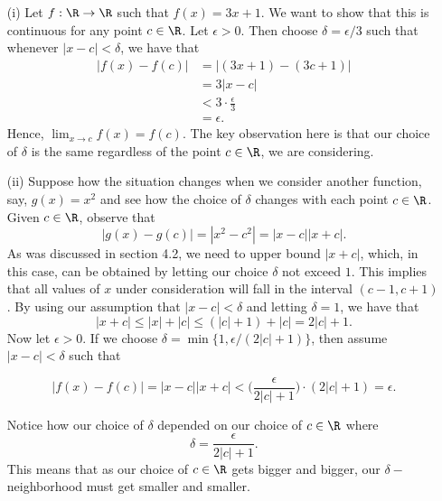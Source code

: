 \begin{example}{}{}
\begin{enumerate}
    \item[(i)] Let \( f: \R \to \R  \) such that \( f(x) = 3x + 1  \). We want to show that this is continuous for any point \( c \in \R  \). Let \( \epsilon  > 0  \). Then choose \( \delta = \epsilon  / 3  \) such that whenever \( | x - c  | < \delta  \), we have that 
\begin{align*}
    | f(x) - f(c) | &= |  (3x + 1 ) - (3c + 1 ) |  \\
                    &= 3 | x - c  | \\
                    &< 3 \cdot \frac{ \epsilon  }{ 3 } \\
                    &= \epsilon.
\end{align*}
Hence, \( \lim_{ x \to c } f(x) = f(c) \). The key observation here is that our choice of \( \delta  \) is the same regardless of the point \( c \in \R  \), we are considering.
    \item[(ii)] Suppose how the situation changes when we consider another function, say, \( g(x) = x^2  \) and see how the choice of \( \delta  \) changes with each point \( c \in \R  \). Given \( c \in \R  \), observe that 
        \[  | g(x) - g(c) | = | x^2 - c^2  | = | x -c | | x + c  |.  \]
As was discussed in section 4.2, we need to upper bound \( | x + c  |  \), which, in this case, can be obtained by letting our choice \( \delta \) not exceed \( 1 \). This implies that all values of \( x  \) under consideration will fall in the interval \( (c - 1, c + 1 ) \). By using our assumption that \( | x - c  | < \delta  \) and letting \( \delta = 1  \), we have that 
\[  | x + c  | \leq | x | + | c  | \leq (| c  | + 1 ) + | c  | = 2 | c | + 1  . \] Now let \( \epsilon  > 0  \). If we choose \( \delta = \min \{ 1, \epsilon / (2 | c  | + 1 ) \} \), then assume \( | x - c  | < \delta  \) such that 

\[ | f(x) - f(c)  | = | x - c  | | x + c  | < \Big( \frac{ \epsilon  }{ 2 | c  | + 1  }  \Big) \cdot ( 2 | c  | + 1) = \epsilon. \]

Notice how our choice of \( \delta \) depended on our choice of \( c \in \R  \) where 
\[  \delta = \frac{ \epsilon  }{ 2 | c  | + 1  }. \]
This means that as our choice of \( c \in \R  \) gets bigger and bigger, our \( \delta - \)neighborhood must get smaller and smaller.
\end{enumerate}
\end{example}


